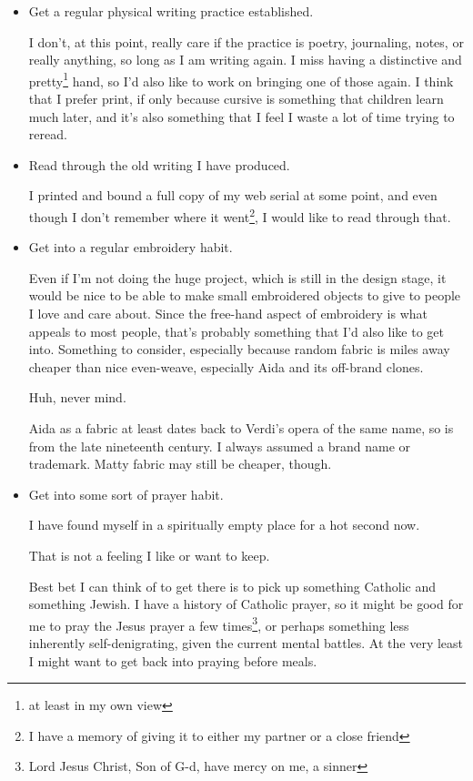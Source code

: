 \documentclass[12pt]{article}
\renewcommand{\,}{\textsuperscript{,}}
\begin{document}
\begin{itemize}
\item Get a regular physical writing practice established.

I don't, at this point, really care if the practice is poetry, journaling, notes, or really anything, so long as I am writing again.  
I miss having a distinctive and pretty\footnote{at least in my own view} hand, so I'd also like to work on bringing one of those again.  
I think that I prefer print, if only because cursive is something that children learn much later, and it's also something that I feel I waste a lot of time trying to reread.

\item Read through the old writing I have produced.

I printed and bound a full copy of my web serial at some point, and even though I don't remember where it went\footnote{I have a memory of giving it to either my partner or a close friend}, I would like to read through that.

\item Get into a regular embroidery habit.

Even if I'm not doing the huge project, which is still in the design stage, it would be nice to be able to make small embroidered objects to give to people I love and care about.  
Since the free-hand aspect of embroidery is what appeals to most people, that's probably something that I'd also like to get into.  
Something to consider, especially because random fabric is miles away cheaper than nice even-weave, especially Aida and its off-brand clones.

Huh, never mind.

Aida as a fabric at least dates back to Verdi's opera of the same name, so is from the late nineteenth century.  
I always assumed a brand name or trademark.  
Matty fabric may still be cheaper, though.

\item Get into some sort of prayer habit.

I have found myself in a spiritually empty place for a hot second now.

That is not a feeling I like or want to keep.

Best bet I can think of to get there is to pick up something Catholic and something Jewish.  
I have a history of Catholic prayer, so it might be good for me to pray the Jesus prayer a few times\footnote{Lord Jesus Christ, Son of G-d, have mercy on me, a sinner}, or perhaps something less inherently self-denigrating, given the current mental battles.  
At the very least I might want to get back into praying before meals.


\end{itemize}
\end{document}
